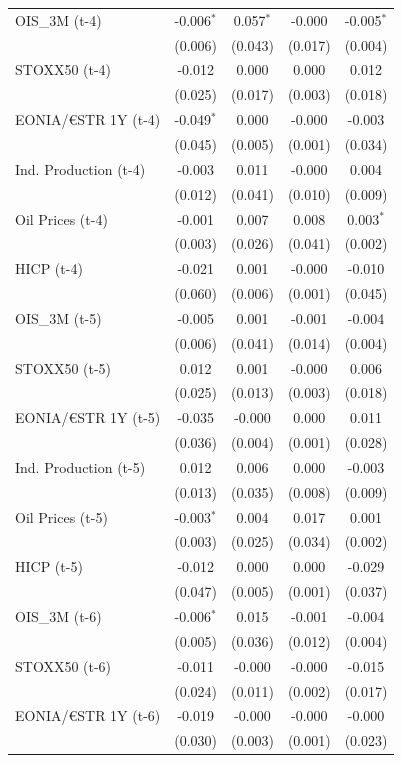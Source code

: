 \begin{longtable}[t]{lcccc}
OIS\_3M (t-4) & -0.006$^{*}$ & 0.057$^{*}$ & -0.000 & -0.005$^{*}$\\
 & (0.006) & (0.043) & (0.017) & (0.004)\\
STOXX50 (t-4) & -0.012 & 0.000 & 0.000 & 0.012\\
 & (0.025) & (0.017) & (0.003) & (0.018)\\
EONIA/€STR 1Y (t-4) & -0.049$^{*}$ & 0.000 & -0.000 & -0.003\\
 & (0.045) & (0.005) & (0.001) & (0.034)\\
Ind. Production (t-4) & -0.003 & 0.011 & -0.000 & 0.004\\
 & (0.012) & (0.041) & (0.010) & (0.009)\\
Oil Prices (t-4) & -0.001 & 0.007 & 0.008 & 0.003$^{*}$\\
 & (0.003) & (0.026) & (0.041) & (0.002)\\
HICP (t-4) & -0.021 & 0.001 & -0.000 & -0.010\\
 & (0.060) & (0.006) & (0.001) & (0.045)\\
OIS\_3M (t-5) & -0.005 & 0.001 & -0.001 & -0.004\\
 & (0.006) & (0.041) & (0.014) & (0.004)\\
STOXX50 (t-5) & 0.012 & 0.001 & -0.000 & 0.006\\
 & (0.025) & (0.013) & (0.003) & (0.018)\\
EONIA/€STR 1Y (t-5) & -0.035 & -0.000 & 0.000 & 0.011\\
 & (0.036) & (0.004) & (0.001) & (0.028)\\
Ind. Production (t-5) & 0.012 & 0.006 & 0.000 & -0.003\\
 & (0.013) & (0.035) & (0.008) & (0.009)\\
Oil Prices (t-5) & -0.003$^{*}$ & 0.004 & 0.017 & 0.001\\
 & (0.003) & (0.025) & (0.034) & (0.002)\\
HICP (t-5) & -0.012 & 0.000 & 0.000 & -0.029\\
 & (0.047) & (0.005) & (0.001) & (0.037)\\
OIS\_3M (t-6) & -0.006$^{*}$ & 0.015 & -0.001 & -0.004\\
 & (0.005) & (0.036) & (0.012) & (0.004)\\
STOXX50 (t-6) & -0.011 & -0.000 & -0.000 & -0.015\\
 & (0.024) & (0.011) & (0.002) & (0.017)\\
EONIA/€STR 1Y (t-6) & -0.019 & -0.000 & -0.000 & -0.000\\
 & (0.030) & (0.003) & (0.001) & (0.023)\\

\end{longtable}
